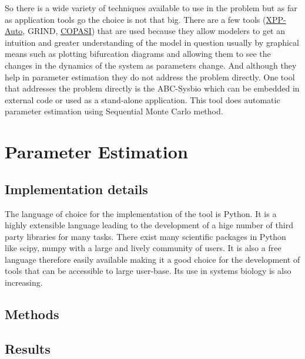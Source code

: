 \documentclass[12pt,a4paper,titlepage]{article}
\begin{document}
So there is a wide variety of techniques available to use in the problem but as far as application tools go the choice is not that big. There are a few tools (\href{http://www.math.pitt.edu/~bard/xpp/xpp.html}{XPP-Auto}, GRIND, \href{http://www.copasi.org/tiki-view_articles.php}{COPASI}) that are used because they allow modelers to get an intuition and greater understanding of the model in question usually by graphical means such as plotting bifurcation diagrams and allowing them to see the changes in the dynamics of the system as parameters change. And although they help in parameter estimation they do not address the problem directly. One tool that addresses the problem directly is the ABC-Sysbio\cite{liebe2010abcpy} which can be embedded in external code or used as a stand-alone application. This tool does automatic parameter estimation using Sequential Monte Carlo method.

\section{Parameter Estimation}
\subsection{Implementation details}
The language of choice for the implementation of the tool is Python. It is a highly extensible language leading to the development of a hige number of third party libraries for many tasks. There exist many scientific packages in Python like scipy\cite{scipy}, numpy with a large and lively community of users. It is also a free language therefore easily available making it a good choice for the development of tools that can be accessible to large user-base. Its use in systems biology is also increasing\cite{myers2007python, olivier2002modelling}.
\subsection{Methods}

\subsection{Results}


\end{document}
